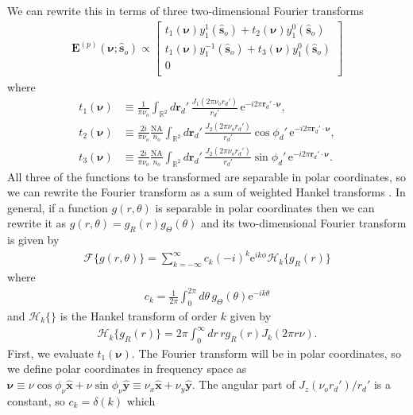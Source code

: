 \documentclass[11pt]{article}
\newcommand{\me}{\mathrm{e}}
\providecommand{\mb}[1]{\mathbf{#1}}
\providecommand{\so}[1]{\mathbf{\hat{s}}_o}
\providecommand{\rd}[1]{\mathbf{r}_d}
\providecommand{\mh}[1]{\mathbf{\hat{#1}}}
\providecommand{\bs}[1]{\boldsymbol{#1}}
\begin{document}
We can rewrite this in terms of three two-dimensional Fourier transforms
\begin{align}
  \mb{E}^{(p)}(\bs{\nu}; \so{}) \propto 
\begin{bmatrix}
    t_1(\bs{\nu})y_1^1(\so{}) + t_2(\bs{\nu})y_1^0(\so{})\\
    t_1(\bs{\nu})y_1^{-1}(\so{}) + t_3(\bs{\nu})y_1^0(\so{})\\
    0\\
  \end{bmatrix}\label{eq:tint}
\end{align}
where
\begin{align}
  t_1(\bs{\nu}) &\equiv \frac{1}{\pi \nu_o}\int_{\mathbb{R}^2}d\rd{}'\,  \frac{J_1(2\pi \nu_or_d')}{r_d'}\, \me^{-i 2\pi\rd{}'\cdot\bs{\nu}},\\
  t_2(\bs{\nu}) &\equiv \frac{2i}{\pi \nu_o}\frac{\text{NA}}{n_o}\int_{\mathbb{R}^2}d\rd{}'\, \frac{J_2(2\pi \nu_or_d')}{r_d'}\cos\phi_d'\, \me^{-i 2\pi\rd{}'\cdot\bs{\nu}},\\
  t_3(\bs{\nu}) &\equiv \frac{2i}{\pi \nu_o}\frac{\text{NA}}{n_o}\int_{\mathbb{R}^2}d\rd{}'\, \frac{J_2(2\pi \nu_or_d')}{r_d'}\sin\phi_d'\, \me^{-i 2\pi\rd{}'\cdot\bs{\nu}}.
\end{align}
All three of the functions to be transformed are separable in polar coordinates,
so we can rewrite the Fourier transform as a sum of weighted Hankel transforms
\cite{goodman1996}. In general, if a function $g(r, \theta)$ is separable in
polar coordinates then we can rewrite it as
$g(r, \theta) = g_{R}(r)g_{\Theta}(\theta)$ and its two-dimensional Fourier transform
is given by
\begin{align}
  \mathcal{F}\{g(r, \theta)\} = \sum_{k=-\infty}^{\infty}c_k(-i)^k\me^{ik\phi}\mathcal{H}_k\{g_R(r)\}
\end{align}
where
\begin{align}
  c_k = \frac{1}{2\pi}\int_0^{2\pi}d\theta\, g_{\Theta}(\theta)\me^{-ik\theta}
\end{align}
and $\mathcal{H}_k\{\}$ is the Hankel transform of order $k$ given by
\begin{align}
  \mathcal{H}_k\{g_R(r)\} = 2\pi\int_0^{\infty}dr\, r g_R(r)J_k(2\pi r \nu).
\end{align}
First, we evaluate $t_1(\bs{\nu})$. The Fourier transform will be in polar
coordinates, so we define polar coordinates in frequency space as
$\bs{\nu} \equiv \nu\cos\phi_\nu\mh{x} + \nu\sin\phi_\nu\mh{y} \equiv \nu_x\mh{x} + \nu_y\mh{y}$. The
angular part of $J_z(\nu_or_d')/r_d'$ is a constant, so $c_k = \delta(k)$ which
\end{document}
